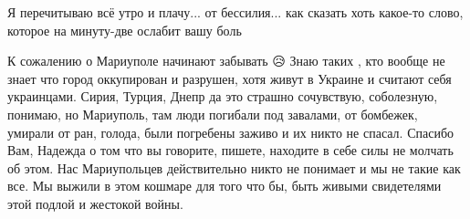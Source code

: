  
 
 
 
 

\qqSecCmt


Я перечитываю всё утро и плачу... от бессилия... как сказать хоть какое-то
слово, которое на минуту-две ослабит вашу боль


К сожалению о Мариуполе начинают забывать 😥 Знаю таких , кто вообще не знает
что город оккупирован и разрушен, хотя живут в Украине и считают себя
украинцами. Сирия, Турция, Днепр да это страшно сочувствую, соболезную,
понимаю, но Мариуполь, там люди погибали под завалами, от бомбежек, умирали
от ран, голода, были погребены заживо и их никто не спасал. Спасибо Вам,
Надежда о том что вы говорите, пишете, находите в себе силы не молчать об
этом. Нас Мариупольцев действительно никто не понимает и мы не такие как все.
Мы выжили в этом кошмаре для того что бы, быть живыми свидетелями этой подлой
и жестокой войны.

